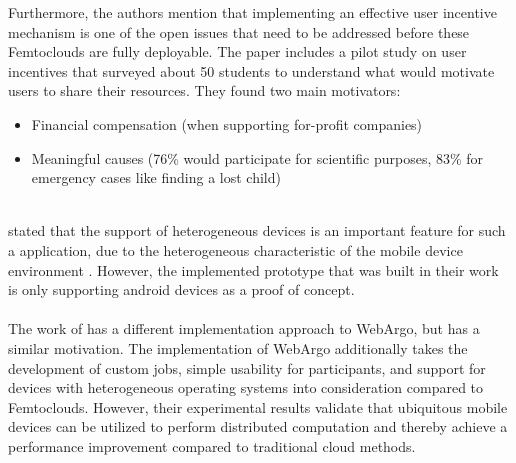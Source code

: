 Furthermore, the authors mention that implementing an effective user incentive mechanism is one of the open issues that need to be addressed before these Femtoclouds are fully deployable. The paper includes a pilot study on user incentives that surveyed about 50 students to understand what would motivate users to share their resources. They found two main motivators:
\begin{itemize}
  \item Financial compensation (when supporting for-profit companies) \cite{relatedwork:mobilecloud}
  \item Meaningful causes (76\% would participate for scientific purposes, 83\% for emergency cases like finding a lost child) \cite{relatedwork:mobilecloud}
\end{itemize}
~\\
\citeauthor{relatedwork:mobilecloud} stated that the support of heterogeneous devices is an important feature for such a application, due to the heterogeneous characteristic of the mobile device environment \cite{relatedwork:mobilecloud}. However, the implemented prototype that was built in their work is only supporting android devices as a proof of concept.
\\~\\
The work of \citeauthor{relatedwork:mobilecloud} has a different implementation approach to WebArgo, but has a similar motivation. The implementation of WebArgo additionally takes the development of custom jobs, simple usability for participants, and support for devices with heterogeneous operating systems into consideration compared to Femtoclouds. However, their experimental results validate that ubiquitous mobile devices can be utilized to perform distributed computation and thereby achieve a performance improvement compared to traditional cloud methods.